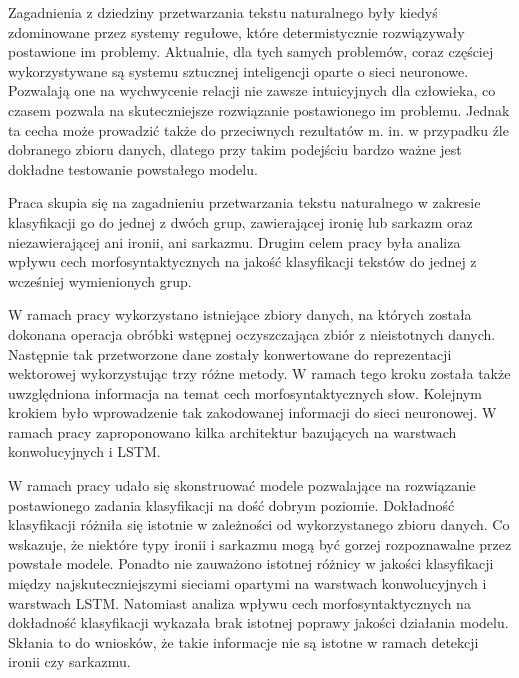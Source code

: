 
Zagadnienia z dziedziny przetwarzania tekstu naturalnego były kiedyś zdominowane przez systemy regułowe, które determistycznie rozwiązywały postawione im problemy. Aktualnie, dla tych samych problemów, coraz częściej wykorzystywane są systemu sztucznej inteligencji oparte o sieci neuronowe. Pozwalają one na wychwycenie relacji nie zawsze intuicyjnych dla człowieka, co czasem pozwala na skuteczniejsze rozwiązanie postawionego im problemu. Jednak ta cecha może prowadzić także do przeciwnych rezultatów m. in. w przypadku źle dobranego zbioru danych, dlatego przy takim podejściu bardzo ważne jest dokładne testowanie powstałego modelu. 

Praca skupia się na zagadnieniu przetwarzania tekstu naturalnego w zakresie klasyfikacji go do jednej z dwóch grup, zawierającej ironię lub sarkazm oraz niezawierającej ani ironii, ani sarkazmu. Drugim celem pracy była analiza wpływu cech morfosyntaktycznych na jakość klasyfikacji tekstów do jednej z wcześniej wymienionych grup.  

W ramach pracy wykorzystano istniejące zbiory danych, na których została dokonana operacja obróbki wstępnej oczyszczająca zbiór z nieistotnych danych. Następnie tak przetworzone dane zostały konwertowane do reprezentacji wektorowej wykorzystując trzy różne metody. W ramach tego kroku została także uwzględniona informacja na temat cech morfosyntaktycznych słow. Kolejnym krokiem było wprowadzenie tak zakodowanej informacji do sieci neuronowej. W ramach pracy zaproponowano kilka architektur bazujących na warstwach konwolucyjnych i LSTM. 

W ramach pracy udało się skonstruować modele pozwalające na rozwiązanie postawionego zadania klasyfikacji na dość dobrym poziomie. Dokładność klasyfikacji różniła się istotnie w zależności od wykorzystanego zbioru danych. Co wskazuje, że niektóre typy ironii i sarkazmu mogą być gorzej rozpoznawalne przez powstałe modele. Ponadto nie zauważono istotnej różnicy w jakości klasyfikacji między najskuteczniejszymi sieciami opartymi na warstwach konwolucyjnych i warstwach LSTM. Natomiast analiza wpływu cech morfosyntaktycznych na dokładność klasyfikacji wykazała brak istotnej poprawy jakości działania modelu. Skłania to do wniosków, że takie informacje nie są istotne w ramach detekcji ironii czy sarkazmu.  




